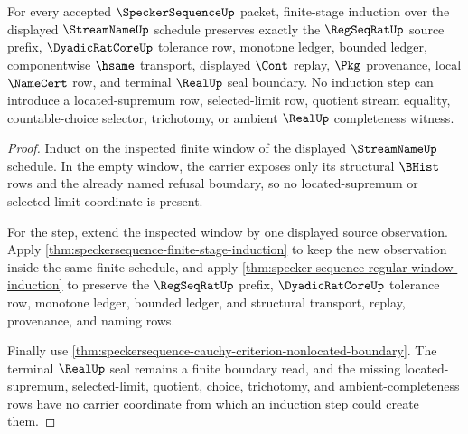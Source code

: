 \begin{theorem}
\label{thm:specker-sequence-window-refusal-induction}
For every accepted $\SpeckerSequenceUp$ packet, finite-stage induction over the displayed $\StreamNameUp$ schedule preserves exactly the $\RegSeqRatUp$ source prefix, $\DyadicRatCoreUp$ tolerance row, monotone ledger, bounded ledger, componentwise $\hsame$ transport, displayed $\Cont$ replay, $\Pkg$ provenance, local $\NameCert$ row, and terminal $\RealUp$ seal boundary. No induction step can introduce a located-supremum row, selected-limit row, quotient stream equality, countable-choice selector, trichotomy, or ambient $\RealUp$ completeness witness.
\end{theorem}
\begin{proof}
Induct on the inspected finite window of the displayed $\StreamNameUp$ schedule. In the empty window, the carrier exposes only its structural $\BHist$ rows and the already named refusal boundary, so no located-supremum or selected-limit coordinate is present.

For the step, extend the inspected window by one displayed source observation. Apply \autoref{thm:speckersequence-finite-stage-induction} to keep the new observation inside the same finite schedule, and apply \autoref{thm:specker-sequence-regular-window-induction} to preserve the $\RegSeqRatUp$ prefix, $\DyadicRatCoreUp$ tolerance row, monotone ledger, bounded ledger, and structural transport, replay, provenance, and naming rows.

Finally use \autoref{thm:speckersequence-cauchy-criterion-nonlocated-boundary}. The terminal $\RealUp$ seal remains a finite boundary read, and the missing located-supremum, selected-limit, quotient, choice, trichotomy, and ambient-completeness rows have no carrier coordinate from which an induction step could create them.
\end{proof}


